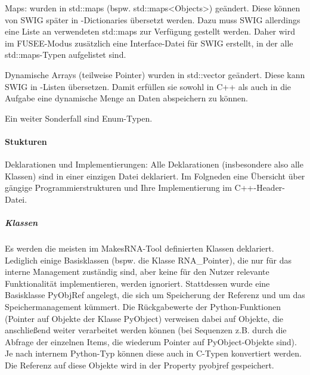 Maps: wurden in std::maps (bspw. std::maps<Objects>) geändert. Diese können von SWIG später in \CS{}-Dictionaries übersetzt werden. Dazu muss SWIG allerdings eine Liste an verwendeten std::maps zur Verfügung gestellt werden. Daher wird im FUSEE-Modus zusätzlich eine Interface-Datei für SWIG erstellt, in der alle std::maps-Typen aufgelistet sind.

Dynamische Arrays (teilweise Pointer) wurden in std::vector geändert. Diese kann SWIG in \CS{}-Listen übersetzen. Damit erfüllen sie sowohl in C++ als auch in \CS{} die Aufgabe eine dynamische Menge an Daten abspeichern zu können.

Ein weiter Sonderfall sind Enum-Typen.


\paragraph{Stukturen}

Deklarationen und Implementierungen: Alle Deklarationen (insbesondere also alle Klassen) sind in einer einzigen Datei deklariert. Im Folgneden eine Übersicht über gängige Programmierstrukturen und Ihre Implementierung im C++-Header-Datei.

\subparagraph{Klassen}

Es werden die meisten im MakesRNA-Tool definierten Klassen deklariert. Lediglich einige Basisklassen (bspw. die Klasse RNA\_Pointer), die nur für das interne Management zuständig sind, aber keine für den Nutzer relevante Funktionalität implementieren, werden ignoriert. Stattdessen wurde eine Basisklasse PyObjRef angelegt, die sich um Speicherung der Referenz und um das Speichermanagement kümmert. Die Rückgabewerte der Python-Funktionen (Pointer auf Objekte der Klasse PyObject) verweisen dabei auf Objekte, die anschließend weiter verarbeitet werden können (bei Sequenzen z.B. durch die Abfrage der einzelnen Items, die wiederum Pointer auf PyObject-Objekte sind). Je nach internem Python-Typ können diese auch in C-Typen konvertiert werden. Die Referenz auf diese Objekte wird in der Property pyobjref gespeichert.

